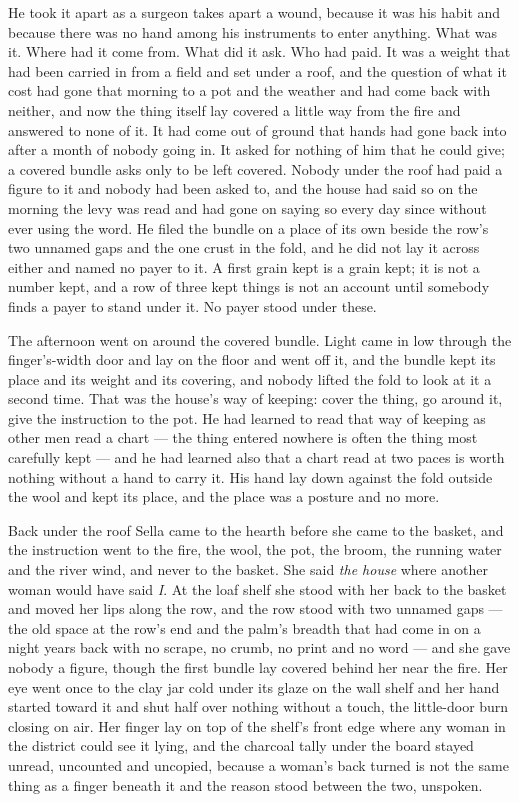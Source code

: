 He took it apart as a surgeon takes apart a wound, because it was his habit and because there was no hand among his instruments to enter anything. What was it. Where had it come from. What did it ask. Who had paid. It was a weight that had been carried in from a field and set under a roof, and the question of what it cost had gone that morning to a pot and the weather and had come back with neither, and now the thing itself lay covered a little way from the fire and answered to none of it. It had come out of ground that hands had gone back into after a month of nobody going in. It asked for nothing of him that he could give; a covered bundle asks only to be left covered. Nobody under the roof had paid a figure to it and nobody had been asked to, and the house had said so on the morning the levy was read and had gone on saying so every day since without ever using the word. He filed the bundle on a place of its own beside the row's two unnamed gaps and the one crust in the fold, and he did not lay it across either and named no payer to it. A first grain kept is a grain kept; it is not a number kept, and a row of three kept things is not an account until somebody finds a payer to stand under it. No payer stood under these.

The afternoon went on around the covered bundle. Light came in low through the finger's-width door and lay on the floor and went off it, and the bundle kept its place and its weight and its covering, and nobody lifted the fold to look at it a second time. That was the house's way of keeping: cover the thing, go around it, give the instruction to the pot. He had learned to read that way of keeping as other men read a chart --- the thing entered nowhere is often the thing most carefully kept --- and he had learned also that a chart read at two paces is worth nothing without a hand to carry it. His hand lay down against the fold outside the wool and kept its place, and the place was a posture and no more.

\scenebreak

Back under the roof Sella came to the hearth before she came to the basket, and the instruction went to the fire, the wool, the pot, the broom, the running water and the river wind, and never to the basket. She said \emph{the house} where another woman would have said \emph{I}. At the loaf shelf she stood with her back to the basket and moved her lips along the row, and the row stood with two unnamed gaps --- the old space at the row's end and the palm's breadth that had come in on a night years back with no scrape, no crumb, no print and no word --- and she gave nobody a figure, though the first bundle lay covered behind her near the fire. Her eye went once to the clay jar cold under its glaze on the wall shelf and her hand started toward it and shut half over nothing without a touch, the little-door burn closing on air. Her finger lay on top of the shelf's front edge where any woman in the district could see it lying, and the charcoal tally under the board stayed unread, uncounted and uncopied, because a woman's back turned is not the same thing as a finger beneath it and the reason stood between the two, unspoken.

